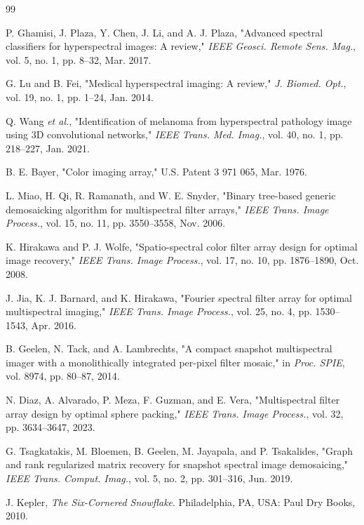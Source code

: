 \documentclass[journal]{IEEEtran}
\begin{document}
\begin{thebibliography}{99}

P. Ghamisi, J. Plaza, Y. Chen, J. Li, and A. J. Plaza, "Advanced spectral classifiers for hyperspectral images: A review," \emph{IEEE Geosci. Remote Sens. Mag.}, vol. 5, no. 1, pp. 8--32, Mar. 2017.

G. Lu and B. Fei, "Medical hyperspectral imaging: A review," \emph{J. Biomed. Opt.}, vol. 19, no. 1, pp. 1--24, Jan. 2014.

Q. Wang \emph{et al.}, "Identification of melanoma from hyperspectral pathology image using 3D convolutional networks," \emph{IEEE Trans. Med. Imag.}, vol. 40, no. 1, pp. 218--227, Jan. 2021.

B. E. Bayer, "Color imaging array," U.S. Patent 3 971 065, Mar. 1976.

L. Miao, H. Qi, R. Ramanath, and W. E. Snyder, "Binary tree-based generic demosaicking algorithm for multispectral filter arrays," \emph{IEEE Trans. Image Process.}, vol. 15, no. 11, pp. 3550--3558, Nov. 2006.

K. Hirakawa and P. J. Wolfe, "Spatio-spectral color filter array design for optimal image recovery," \emph{IEEE Trans. Image Process.}, vol. 17, no. 10, pp. 1876--1890, Oct. 2008.

J. Jia, K. J. Barnard, and K. Hirakawa, "Fourier spectral filter array for optimal multispectral imaging," \emph{IEEE Trans. Image Process.}, vol. 25, no. 4, pp. 1530--1543, Apr. 2016.

B. Geelen, N. Tack, and A. Lambrechts, "A compact snapshot multispectral imager with a monolithically integrated per-pixel filter mosaic," in \emph{Proc. SPIE}, vol. 8974, pp. 80--87, 2014.

N. Diaz, A. Alvarado, P. Meza, F. Guzman, and E. Vera, "Multispectral filter array design by optimal sphere packing," \emph{IEEE Trans. Image Process.}, vol. 32, pp. 3634--3647, 2023.

G. Tsagkatakis, M. Bloemen, B. Geelen, M. Jayapala, and P. Tsakalides, "Graph and rank regularized matrix recovery for snapshot spectral image demosaicing," \emph{IEEE Trans. Comput. Imag.}, vol. 5, no. 2, pp. 301--316, Jun. 2019.

J. Kepler, \emph{The Six-Cornered Snowflake}. Philadelphia, PA, USA: Paul Dry Books, 2010.


\end{thebibliography}
\end{document}
